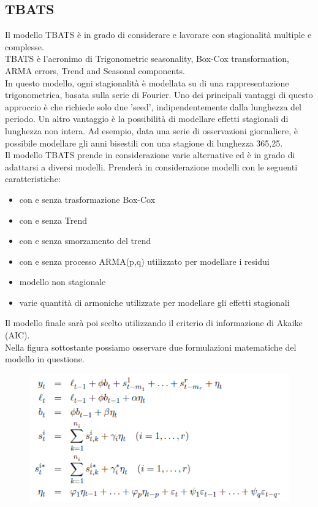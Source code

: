\documentclass[12pt, a4paper, twocolumn]{article} %
\begin{document}
\subsection{TBATS}
Il modello TBATS è in grado di considerare e lavorare con stagionalità multiple e complesse.\\
TBATS è l'acronimo di Trigonometric seasonality, Box-Cox transformation, ARMA errors, Trend and Seasonal components.\\
In questo modello, ogni stagionalità è modellata su di una rappresentazione trigonometrica, basata sulla serie di Fourier. Uno dei principali vantaggi di questo approccio è che richiede solo due 'seed', indipendentemente dalla lunghezza del periodo. Un altro vantaggio è la possibilità di modellare effetti stagionali di lunghezza non intera. Ad esempio, data una serie di osservazioni giornaliere, è possibile modellare gli anni bisestili con una stagione di lunghezza 365,25.\\
Il modello TBATS prende in considerazione varie alternative ed è in grado di adattarsi a diversi modelli. Prenderà in considerazione modelli con le seguenti caratteristiche:
\begin{itemize}
\item con e senza trasformazione Box-Cox
\item con e senza Trend
\item con e senza smorzamento del trend
\item con e senza processo ARMA(p,q) utilizzato per modellare i residui
\item modello non stagionale
\item varie quantità di armoniche utilizzate per modellare gli effetti stagionali
\end{itemize}
Il modello finale sarà poi scelto utilizzando il criterio di informazione di Akaike (AIC).\\
Nella figura sottostante possiamo osservare due formulazioni matematiche del modello in questione.

\begin{figure}
  \caption{\protect\cite{dispensa}}
  \begin{center}
    \includegraphics{tbats.png}
  \end{center}
\end{figure}
\end{document}

